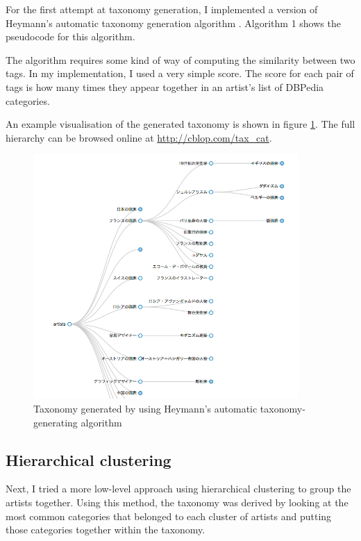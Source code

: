 \documentclass[11pt]{article}
\begin{document}
For the first attempt at taxonomy generation, I implemented a version of Heymann's automatic taxonomy generation algorithm \cite{heymann2006collaborative}. Algorithm 1 shows the pseudocode for this algorithm.

The algorithm requires some kind of way of computing the similarity between two tags. In my implementation, I used a very simple score. The score for each pair of tags is how many times they appear together in an artist's list of DBPedia categories.

An example visualisation of the generated taxonomy is shown in figure \ref{fig:taxon}. The full hierarchy can be browsed online at \url{http://cblop.com/tax_cat}.

\begin{figure}
        \centering
                \includegraphics[width=0.9\textwidth]{taxon.png}
        \caption{Taxonomy generated by using Heymann's automatic taxonomy-generating algorithm}\label{fig:taxon}
\end{figure}

\subsection{Hierarchical clustering}
Next, I tried a more low-level approach using hierarchical clustering to group the artists together. Using this method, the taxonomy was derived by looking at the most common categories that belonged to each cluster of artists and putting those categories together within the taxonomy.
\end{document}
